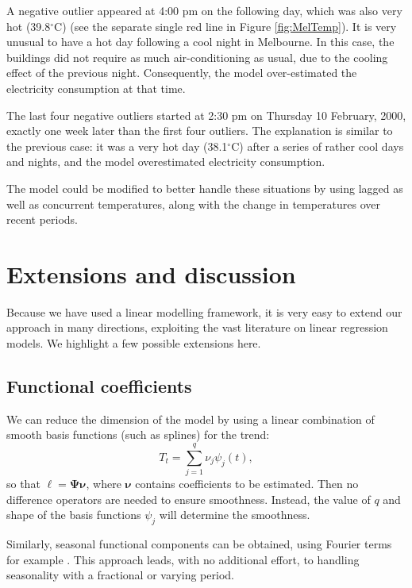 \documentclass[11pt,a4paper,]{article}
\begin{document}
A negative outlier appeared at 4:00 pm on the following day, which was also very hot (39.8\(^{\circ}\)C) (see the separate single red line in Figure \ref{fig:MelTemp}). It is very unusual to have a hot day following a cool night in Melbourne. In this case, the buildings did not require as much air-conditioning as usual, due to the cooling effect of the previous night. Consequently, the model over-estimated the electricity consumption at that time.

The last four negative outliers started at 2:30 pm on Thursday 10 February, 2000, exactly one week later than the first four outliers. The explanation is similar to the previous case: it was a very hot day (38.1\(^{\circ}\)C) after a series of rather cool days and nights, and the model overestimated electricity consumption.

The model could be modified to better handle these situations by using lagged as well as concurrent temperatures, along with the change in temperatures over recent periods.

\hypertarget{extensions-and-discussion}{%
\section{Extensions and discussion}\label{extensions-and-discussion}}

Because we have used a linear modelling framework, it is very easy to extend our approach in many directions, exploiting the vast literature on linear regression models. We highlight a few possible extensions here.

\hypertarget{sec:func-coeff}{%
\subsection{Functional coefficients}\label{sec:func-coeff}}

We can reduce the dimension of the model by using a linear combination of smooth basis functions (such as splines) for the trend:
\begin{equation}
  \label{l_t}
  T_t = \sum_{j=1}^{q}\nu_j \psi_j(t),
\end{equation}
so that \(\bm\ell = \bm{\Psi}\bm{\nu}\), where \(\bm{\nu}\) contains coefficients to be estimated. Then no difference operators are needed to ensure smoothness. Instead, the value of \(q\) and shape of the basis functions \(\psi_j\) will determine the smoothness.

Similarly, seasonal functional components can be obtained, using Fourier terms for example \autocite[reminiscent of][]{de2011forecasting}. This approach leads, with no additional effort, to handling seasonality with a fractional or varying period.
\end{document}
